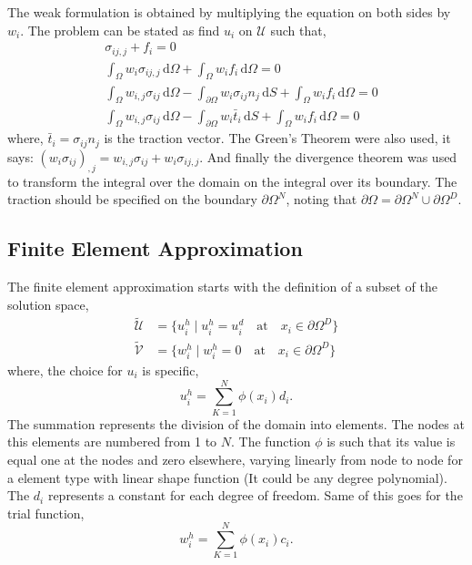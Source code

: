 \documentclass[11pt, a4paper]{article}
\numberwithin{equation}{section}
\begin{document}
The weak formulation is obtained by multiplying the equation on both sides by $w_i$. The problem can be stated as find $u_i$ on $\mathcal{U}$ such that,
\begin{align*}
&
\sigma_{ij,j} + f_i = 0 \\
&
\int_{\Omega}w_i \sigma_{ij,j} \, \mathrm{d}\Omega + \int_{\Omega} w_i f_i \, \mathrm{d}\Omega = 0\\
&
\int_\Omega w_{i,j}  \sigma_{ij} \, \mathrm{d}\Omega
- \int_{\partial \Omega} w_i \sigma_{ij} n_j \, \mathrm{d}S+\int_\Omega w_i f_i \, \mathrm{d}\Omega = 0
\\&
\int_\Omega w_{i,j}  \sigma_{ij} \, \mathrm{d}\Omega
- \int_{\partial \Omega} w_i \bar{t}_i \, \mathrm{d}S+\int_\Omega w_i f_i \, \mathrm{d}\Omega = 0
\end{align*}
where, $\bar{t}_i=\sigma_{ij}n_j$ is the traction vector. The Green's Theorem were also used, it says: $(w_i \sigma_{ij})_{,j} = w_{i,j}\sigma_{ij} + w_i \sigma_{ij,j}$. And finally the divergence theorem was used to transform the integral over the domain on the integral over its boundary. The traction should be specified on the boundary $\partial \Omega^N$, noting that $\partial \Omega = \partial \Omega^N \cup \partial \Omega^D$.




\subsection{Finite Element Approximation}

The finite element approximation starts with the definition of a subset of the solution space,
\begin{align*}
\mathcal{\tilde{U}} &= \{ u_i^h \;|\; u_i^h = u_i^d \quad \text{at} \quad x_i \in \partial \Omega^D \} \\
\mathcal{\tilde{V}} &= \{ w_i^h \;|\; w_i^h = 0 \quad \text{at} \quad x_i \in \partial \Omega^D \}
\end{align*}
where, the choice for $u_i$ is specific,
\begin{equation}
u^h_i = \sum_{K=1}^N \phi(x_i) d_i.
\end{equation}
The summation represents the division of the domain into elements. The nodes at this elements are numbered from 1 to $N$. The function $\phi$ is such that its value is equal one at the nodes and zero elsewhere, varying linearly from node to node for a element type with linear shape function (It could be any degree polynomial). The $d_i$ represents a constant for each degree of freedom. Same of this goes for the trial function,
\begin{equation}
w^h_i = \sum_{K=1}^N \phi(x_i) c_i.
\end{equation}
\end{document}
